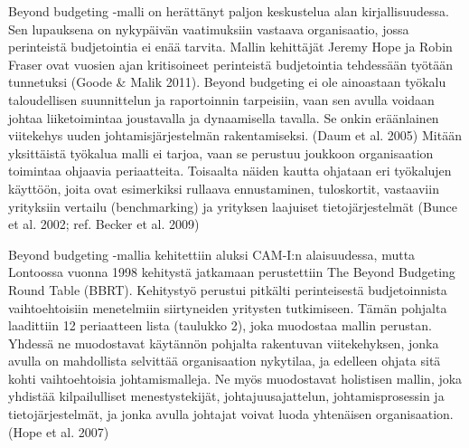 \documentclass[12pt,a4paper,oneside,pdftex]{report}
\begin{document}
Beyond budgeting -malli on herättänyt paljon keskustelua alan kirjallisuudessa. Sen lupauksena on nykypäivän vaatimuksiin vastaava organisaatio, jossa perinteistä budjetointia ei enää tarvita. Mallin kehittäjät Jeremy Hope ja Robin Fraser ovat vuosien ajan kritisoineet perinteistä budjetointia tehdessään työtään tunnetuksi (Goode & Malik 2011). Beyond budgeting ei ole ainoastaan työkalu taloudellisen suunnittelun ja raportoinnin tarpeisiin, vaan sen avulla voidaan johtaa liiketoimintaa joustavalla ja dynaamisella tavalla. Se onkin eräänlainen viitekehys uuden johtamisjärjestelmän rakentamiseksi. (Daum et al. 2005) Mitään yksittäistä työkalua malli ei tarjoa, vaan se perustuu joukkoon organisaation toimintaa ohjaavia periaatteita. Toisaalta näiden kautta ohjataan eri työkalujen käyttöön, joita ovat esimerkiksi rullaava ennustaminen, tuloskortit, vastaaviin yrityksiin vertailu (benchmarking) ja yrityksen laajuiset tietojärjestelmät (Bunce et al. 2002; ref. Becker et al. 2009)

Beyond budgeting -mallia kehitettiin aluksi CAM-I:n alaisuudessa, mutta Lontoossa vuonna 1998 kehitystä jatkamaan perustettiin The Beyond Budgeting Round Table (BBRT). Kehitystyö perustui pitkälti perinteisestä budjetoinnista vaihtoehtoisiin menetelmiin siirtyneiden yritysten tutkimiseen. Tämän pohjalta laadittiin 12 periaatteen lista (taulukko 2), joka muodostaa mallin perustan. Yhdessä ne muodostavat käytännön pohjalta rakentuvan viitekehyksen, jonka avulla on mahdollista selvittää organisaation nykytilaa, ja edelleen ohjata sitä kohti vaihtoehtoisia johtamismalleja. Ne myös muodostavat holistisen mallin, joka yhdistää kilpailulliset menestystekijät, johtajuusajattelun, johtamisprosessin ja tietojärjestelmät, ja jonka avulla johtajat voivat luoda yhtenäisen organisaation. (Hope et al. 2007)
\end{document}
